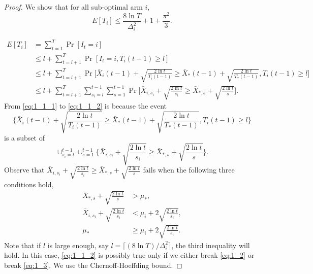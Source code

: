 \begin{proof}
    We show that for all sub-optimal arm $i$,
    \begin{equation}
        E[T_i] \le \frac{8\ln T}{\Delta_i^2} + 1 + \frac{\pi^2}{3}.
    \end{equation}

    \begin{align}
        E[T_i]
            &= \sum_{t=1}^T \Pr[I_t=i] \\
            &\le l + \sum_{t=l+1}^T \Pr[I_t=i, T_i(t-1)\ge l] \\
            &\le l + \sum_{t=l+1}^T \Pr\Bigg[\bar X_{i}(t-1) +
                \sqrt{\frac{2\ln t}{T_i(t-1)}}\ge \bar X_{*}(t-1)+
                \sqrt{\frac{2\ln t}{T_{*}(t-1)}}, T_i(t-1)\ge l\Bigg] \label{eq:1_1_1}\\
            &\le l + \sum_{t=l+1}^T \sum_{s_i=l}^{t-1} \sum_{s=1}^{t-1}
                \Pr\Bigg[\bar X_{i,s_i} + \sqrt{\frac{2\ln t}{s_i}}\ge
                \bar X_{*,s}+\sqrt{\frac{2\ln t}{s}}\Bigg]. \label{eq:1_1_2}
    \end{align}
    From \eqref{eq:1_1_1} to \eqref{eq:1_1_2} is because the event
    \begin{equation}
        \Bigg\{\bar X_{i}(t-1) + \sqrt{\frac{2\ln t}{T_i(t-1)}}\ge
        \bar X_{*}(t-1)+\sqrt{\frac{2\ln t}{T_{*}(t-1)}}, T_i(t-1)\ge l\Bigg\}
    \end{equation}
    is a subset of
    \begin{equation}
        \cup_{s_i=l}^{t-1} \cup_{s=1}^{t-1}\Bigg\{\bar X_{i,s_i} + \sqrt{\frac{2\ln t}{s_i}}\ge
        \bar X_{*,s}+\sqrt{\frac{2\ln t}{s}}\Bigg\}.
    \end{equation}
    Observe that $\bar X_{i,s_i} + \sqrt{\frac{2\ln t}{s_i}}\ge\bar X_{*,s}+\sqrt{\frac{2\ln t}{s}}$
    fails when the following three conditions hold,
    \begin{align}
        \bar X_{*,s} + \sqrt{\frac{2\ln t}{s}} &> \mu_*,  \\
        \bar X_{i,s_i} + \sqrt{\frac{2\ln t}{s_i}} &< \mu_i + 2\sqrt{\frac{2\ln t}{s_i}}, \label{eq:1_2} \\
        \mu_* &\ge \mu_i + 2\sqrt{\frac{2\ln t}{s_i}}. \label{eq:1_3}
    \end{align}
    Note that if $l$ is large enough,
    say $l=\lceil (8\ln T)/\Delta_i^2\rceil$,
    the third inequality will hold.
    In this case,
    \eqref{eq:1_1_2} is possibly true only if we either break \eqref{eq:1_2} or break \eqref{eq:1_3}.
    We use the Chernoff-Hoeffding bound.

\end{proof}
